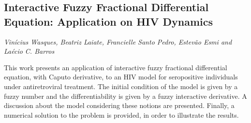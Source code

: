 \documentclass[../booklet.tex]{subfiles}
\begin{document}
\subsection[Interactive Fuzzy Fractional Differential Equation: Application on HIV Dynamics. {\it Vinícius Wasques, Beatriz Laiate, Francielle Santo Pedro, Estevão Esmi and Laécio C. Barros}]{Interactive Fuzzy Fractional Differential Equation: Application on HIV Dynamics}
    

\begin{center}
  {\it Vinícius Wasques, Beatriz Laiate, Francielle Santo Pedro, Estevão Esmi and Laécio C. Barros}
\end{center}

\vskip 0.8cm



This work presents an application of interactive fuzzy fractional differential equation, with Caputo derivative, to an HIV model for seropositive individuals under antiretroviral treatment. The initial condition of the model is given by a fuzzy number and the differentiability is given by a fuzzy interactive derivative. A discussion about the model considering these notions are presented. Finally, a numerical solution to the problem is provided, in order to illustrate the results.

\end{document}
